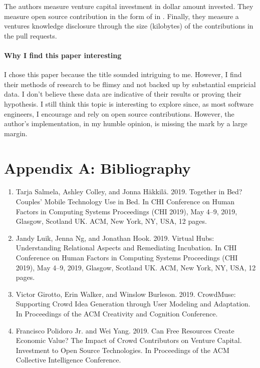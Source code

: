 The authors measure venture capital investment in dollar amount invested. They measure open source contribution in the form of  in . Finally, they measure a ventures knowledge disclosure through the size (kilobytes) of the contributions in the pull requests.

\paragraph{Why I find this paper interesting}
I chose this paper because the title sounded intriguing to me. However, I find their methods of research to be flimsy and not backed up by substantial empricial data. I don't believe these data are indicative of their results or proving their hypothesis. I still think this topic is interesting to explore since, as most software engineers, I encourage and rely on open source contributions. However, the author's implementation, in my humble opinion, is missing the mark by a large margin.

\clearpage

\section{Appendix A: Bibliography}

\begin{enumerate}
\item
  Tarja Salmela, Ashley Colley, and Jonna Häkkilä. 2019. Together in Bed? Couples’ Mobile Technology Use in Bed. In CHI Conference on Human Factors in Computing Systems Proceedings (CHI 2019), May 4–9, 2019, Glasgow, Scotland UK. ACM, New York, NY, USA, 12 pages. 
\item
  Jandy Luik, Jenna Ng, and Jonathan Hook. 2019. Virtual Hubs: Understanding Relational Aspects and Remediating Incubation. In CHI Conference on Human Factors in Computing Systems Proceedings (CHI 2019), May 4–9, 2019, Glasgow, Scotland UK. ACM, New York, NY, USA, 12 pages. 
\item
  Victor Girotto, Erin Walker, and Winslow Burleson. 2019. CrowdMuse: Supporting Crowd Idea Generation through User Modeling and Adaptation. In Proceedings of the ACM Creativity and Cognition Conference. 
\item
  Francisco Polidoro Jr. and Wei Yang. 2019. Can Free Resources Create Economic Value? The Impact of Crowd Contributors on Venture Capital. Investment to Open Source Technologies. In Proceedings of the ACM Collective Intelligence Conference. 
\end{enumerate}


